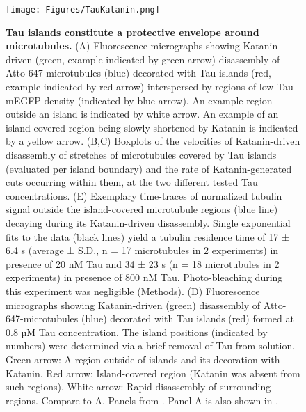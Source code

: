 \begin{figure}[!h]
	\centering
	\texttt{[image: Figures/TauKatanin.png]}
	\caption[Tau islands constitute a protective envelope around microtubules.]{
	\textbf{Tau islands constitute a protective envelope around microtubules.} (A) Fluorescence micrographs showing Katanin-driven (green, example indicated by green arrow) disassembly of Atto-647-microtubules (blue) decorated with Tau islands (red, example indicated by red arrow) interspersed by regions of low Tau-mEGFP density (indicated by blue arrow). An example region outside an island is indicated by white arrow. An example of an island-covered region being slowly shortened by Katanin is indicated by a yellow arrow. (B,C) Boxplots of the velocities of Katanin-driven disassembly of stretches of microtubules covered by Tau islands (evaluated per island boundary) and the rate of Katanin-generated cuts occurring within them, at the two different tested Tau concentrations. (E) Exemplary time-traces of normalized tubulin signal outside the island-covered microtubule regions (blue line) decaying during its Katanin-driven disassembly. Single exponential fits to the data (black lines) yield a tubulin residence time of 17 ± 6.4 s (average ± S.D., n = 17 microtubules in 2 experiments) in presence of 20 nM Tau and 34 ± 23 s (n = 18 microtubules in 2 experiments) in presence of 800 nM Tau. Photo-bleaching during this experiment was negligible (Methods). (D) Fluorescence micrographs showing Katanin-driven (green) disassembly of Atto-647-microtubules (blue) decorated with Tau islands (red) formed at 0.8 µM Tau concentration. The island positions (indicated by numbers) were determined via a brief removal of Tau from solution. Green arrow: A region outside of islands and its decoration with Katanin. Red arrow: Island-covered region (Katanin was absent from such regions). White arrow: Rapid disassembly of surrounding regions. Compare to A. Panels from \cite{Siahaan2019a}. Panel A is also shown in \cite{Siahaan}.
		}\label{TauKatanin}
\end{figure}

